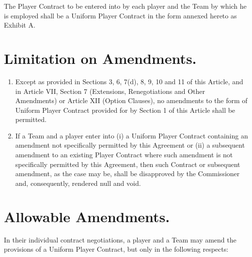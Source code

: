 \documentclass[
]{book}
\providecommand{\tightlist}{%
  \setlength{\itemsep}{0pt}\setlength{\parskip}{0pt}}
\begin{document}
The Player Contract to be entered into by each player and the Team by which he is employed shall be a Uniform Player Contract in the form annexed hereto as Exhibit A.

\hypertarget{limitation-on-amendments.}{%
\section{Limitation on Amendments.}\label{limitation-on-amendments.}}

\begin{enumerate}
\def\labelenumi{(\alph{enumi})}
\tightlist
\item
  Except as provided in Sections 3, 6, 7(d), 8, 9, 10 and 11 of this Article, and in Article VII, Section 7 (Extensions, Renegotiations and Other Amendments) or Article XII (Option Clauses), no amendments to the form of Uniform Player Contract provided for by Section 1 of this Article shall be permitted.
\item
  If a Team and a player enter into (i) a Uniform Player Contract containing an amendment not specifically permitted by this Agreement or (ii) a subsequent amendment to an existing Player Contract where such amendment is not specifically permitted by this Agreement, then such Contract or subsequent amendment, as the case may be, shall be disapproved by the Commissioner and, consequently, rendered null and void.
\end{enumerate}

\hypertarget{allowable-amendments.}{%
\section{Allowable Amendments.}\label{allowable-amendments.}}

In their individual contract negotiations, a player and a Team may amend the provisions of a Uniform Player Contract, but only in the following respects:
\end{document}
